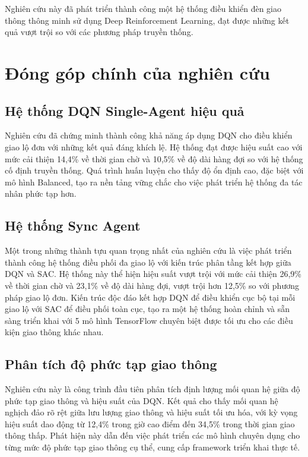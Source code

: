 Nghiên cứu này đã phát triển thành công một hệ thống điều khiển đèn giao thông thông minh sử dụng Deep Reinforcement Learning, đạt được những kết quả vượt trội so với các phương pháp truyền thống.

\section{Đóng góp chính của nghiên cứu}

\subsection{Hệ thống DQN Single-Agent hiệu quả}
Nghiên cứu đã chứng minh thành công khả năng áp dụng DQN cho điều khiển giao lộ đơn với những kết quả đáng khích lệ. Hệ thống đạt được hiệu suất cao với mức cải thiện 14,4\% về thời gian chờ và 10,5\% về độ dài hàng đợi so với hệ thống cố định truyền thống. Quá trình huấn luyện cho thấy độ ổn định cao, đặc biệt với mô hình Balanced, tạo ra nền tảng vững chắc cho việc phát triển hệ thống đa tác nhân phức tạp hơn.

\subsection{Hệ thống Sync Agent}
Một trong những thành tựu quan trọng nhất của nghiên cứu là việc phát triển thành công hệ thống điều phối đa giao lộ với kiến trúc phân tầng kết hợp giữa DQN và SAC. Hệ thống này thể hiện hiệu suất vượt trội với mức cải thiện 26,9\% về thời gian chờ và 23,1\% về độ dài hàng đợi, vượt trội hơn 12,5\% so với phương pháp giao lộ đơn. Kiến trúc độc đáo kết hợp DQN để điều khiển cục bộ tại mỗi giao lộ với SAC để điều phối toàn cục, tạo ra một hệ thống hoàn chỉnh và sẵn sàng triển khai với 5 mô hình TensorFlow chuyên biệt được tối ưu cho các điều kiện giao thông khác nhau.

\subsection{Phân tích độ phức tạp giao thông}
Nghiên cứu này là công trình đầu tiên phân tích định lượng mối quan hệ giữa độ phức tạp giao thông và hiệu suất của DQN. Kết quả cho thấy mối quan hệ nghịch đảo rõ rệt giữa lưu lượng giao thông và hiệu suất tối ưu hóa, với kỳ vọng hiệu suất dao động từ 12,4\% trong giờ cao điểm đến 34,5\% trong thời gian giao thông thấp. Phát hiện này dẫn đến việc phát triển các mô hình chuyên dụng cho từng mức độ phức tạp giao thông cụ thể, cung cấp framework triển khai thực tế.

